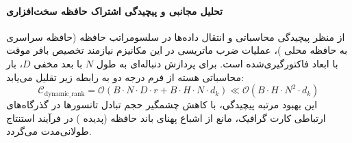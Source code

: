 \paragraph{تحلیل مجانبی و پیچیدگی اشتراک حافظه سخت‌افزاری}
از منظر پیچیدگی محاسباتی و انتقال داده‌ها در سلسومراتب حافظه (حافظه سراسری  به حافظه محلی )، عملیات ضرب ماتریسی در این مکانیزم نیازمند تخصیص بافر موقت با ابعاد فاکتورگیری‌شده است. برای پردازش دنباله‌ای به طول $N$ با بعد مخفی $D$، بار محاسباتی هسته از فرم درجه دو به رابطه زیر تقلیل می‌یابد:
\begin{equation}
\label{eq:complexity_dynamic_rank}
\mathcal{C}_{\text{dynamic\_rank}} = \mathcal{O}\left( B \cdot N \cdot D \cdot r + B \cdot H \cdot N \cdot d_k \right) \ll \mathcal{O}\left( B \cdot H \cdot N^2 \cdot d_k \right)
\end{equation}
این بهبود مرتبه پیچیدگی، با کاهش چشمگیر حجم تبادل تانسورها در گذرگاه‌های ارتباطی کارت گرافیک، مانع از اشباع پهنای باند حافظه (پدیده ) در فرآیند استنتاج طولانی‌مدت می‌گردد.
